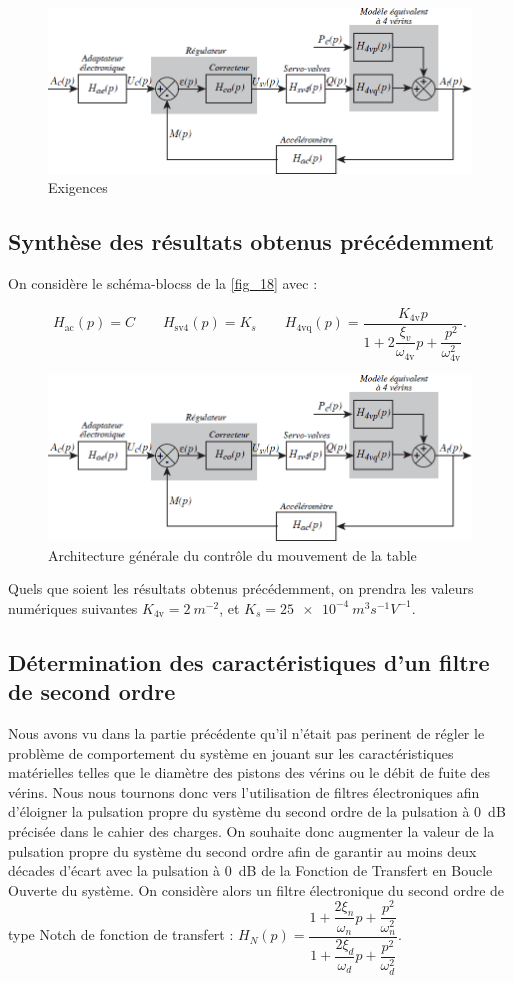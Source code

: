 \documentclass[10pt,fleqn]{article} %
\begin{document}
\begin{figure}[H]
\centering
\includegraphics[width=0.7\linewidth]{fig_17}
\caption{Exigences \label{req_02}}
\end{figure}

\subsection{Synthèse des résultats obtenus précédemment}

On considère le schéma-blocss de la \autoref{fig_18} avec :

$$
H_{\text{ac}}(p)=C
\quad \quad
H_{\text{sv4}}(p)=K_s
\quad \quad
H_{\text{4vq}}(p)=\dfrac{K_{\text{4v}}p}{1+2\dfrac{\xi_v}{\omega_{\text{4v}}}p+\dfrac{p^2}{\omega^2_{\text{4v}}}}.
$$


\begin{figure}[H]
\centering
\includegraphics[width=0.7\linewidth]{fig_18}
\caption{Architecture générale du contrôle du mouvement de la table \label{fig_18}}
\end{figure}

Quels que soient les résultats obtenus précédemment, on prendra les valeurs numériques suivantes
$K_{\text{4v}}=\SI{2}{m^{-2}}$,
et $K_s = \SI{25e-4}{m^3s^{-1}V^{-1}}$.

\subsection{Détermination des caractéristiques d’un filtre de second ordre}


Nous avons vu dans la partie précédente qu'il n'était pas perinent de régler le problème de comportement du système en jouant sur les caractéristiques matérielles telles que le diamètre des pistons des vérins ou le débit de fuite des vérins. Nous nous tournons donc vers l’utilisation de filtres électroniques afin d’éloigner la pulsation
propre du système du second ordre de la pulsation à \SI{0}{dB} précisée dans le cahier des charges. On souhaite donc
augmenter la valeur de la pulsation propre du système du second ordre afin de garantir au moins deux décades
d’écart avec la pulsation à \SI{0}{dB} de la Fonction de Transfert en Boucle Ouverte du système. On considère alors
un filtre électronique du second ordre de type Notch de fonction de transfert : $H_N(p)=\dfrac{1+\dfrac{2\xi_n}{\omega_n}p+\dfrac{p^2}{\omega_n^2}}{1+\dfrac{2\xi_d}{\omega_d}p+\dfrac{p^2}{\omega_d^2}}$.
\end{document}
